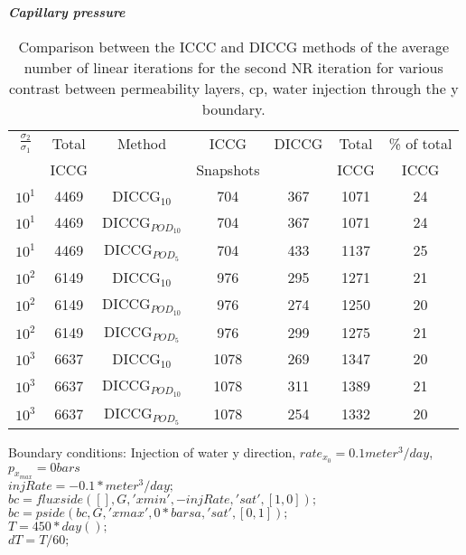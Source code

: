 \documentclass[a4paper,10pt]{report}
\begin{document}
\emph{\textbf{Capillary pressure}}
\begin{table}[!ht]\centering
\begin{minipage}{1\textwidth}
 \centering
\begin{tabular}{ ||c|c||c|c|c|c|c||} 
\hline
$\frac{\sigma_2}{\sigma_1}$&Total&Method  & ICCG&DICCG &Total&\% of total\\ 
                           & ICCG     &  & Snapshots& &ICCG& ICCG\\ 
\hline 
$10^{1}$ &4469& DICCG$_{10}$&704&367&1071&24\\ 
\hline  
$10^{1}$ &4469& DICCG$_{POD_{10}}$&704&367&1071&24 \\ 
\hline  
$10^{1}$ &4469& DICCG$_{POD_{5}}$&704&433&1137&25 \\ 
\hline   
$10^{2}$ &6149& DICCG$_{10}$&976&295&1271&21\\ 
\hline  
$10^{2}$ &6149& DICCG$_{POD_{10}}$&976&274&1250&20 \\ 
\hline  
$10^{2}$ &6149& DICCG$_{POD_{5}}$&976&299&1275&21 \\ 
\hline 
$10^{3}$ &6637& DICCG$_{10}$&1078&269&1347&20\\ 
\hline  
$10^{3}$ &6637& DICCG$_{POD_{10}}$&1078&311&1389&21 \\ 
\hline  
$10^{3}$ &6637& DICCG$_{POD_{5}}$&1078&254&1332&20 \\ 
\hline  
\end{tabular} 
\caption{Comparison between the ICCC and DICCG methods of the average number of linear iterations for the second NR iteration for various contrast between permeability layers, cp, water injection through the y boundary. }\label{table:litertot2} 
\end{minipage}  
\end{table}  


\newpage 
Boundary conditions:
Injection of water y direction, $rate_{x_0}=0.1meter^3/day$, $p_{x_{max}}=0bars$\\
$injRate = -0.1*meter^3/day;$\\
$bc = fluxside([], G, 'xmin', -injRate, 'sat', [1, 0]);$\\
$bc = pside(bc, G, 'xmax', 0*barsa, 'sat', [0, 1]);$\\
$T      = 450*day();$    \\
$dT     = T/60;$\\
\end{document}
